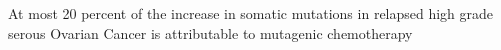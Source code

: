 At most 20 percent of the increase in somatic mutations in relapsed high grade serous Ovarian Cancer is attributable to mutagenic chemotherapy
